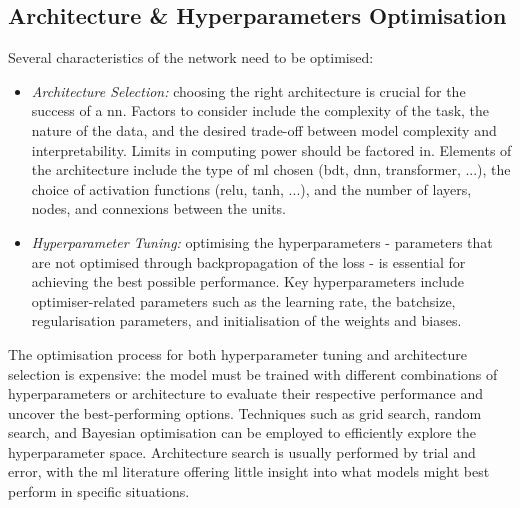 \subsection{Architecture \& Hyperparameters Optimisation}
Several characteristics of the network need to be optimised: 
\begin{itemize}[leftmargin=*]
    \item \textit{Architecture Selection:} choosing the right architecture is crucial for the success of a \gls{nn}. Factors to consider include the complexity of the task, the nature of the data, and the desired trade-off between model complexity and interpretability. Limits in computing power should be factored in. Elements of the architecture include the type of \gls{ml} chosen (\gls{bdt}, \gls{dnn}, transformer, ...), the choice of activation functions (\gls{relu}, tanh, ...), and the number of layers, nodes, and connexions between the units.
    \item \textit{Hyperparameter Tuning:} optimising the hyperparameters - parameters that are not optimised through backpropagation of the loss - is essential for achieving the best possible performance. Key hyperparameters include optimiser-related parameters such as the learning rate, the batchsize, regularisation parameters, and initialisation of the weights and biases.
\end{itemize}
The optimisation process for both hyperparameter tuning and architecture selection is expensive: the model must be trained with different combinations of hyperparameters or architecture to evaluate their respective performance and uncover the best-performing options. Techniques such as grid search, random search, and Bayesian optimisation can be employed to efficiently explore the hyperparameter space. Architecture search is usually performed by trial and error, with the \gls{ml} literature offering little insight into what models might best perform in specific situations. 

